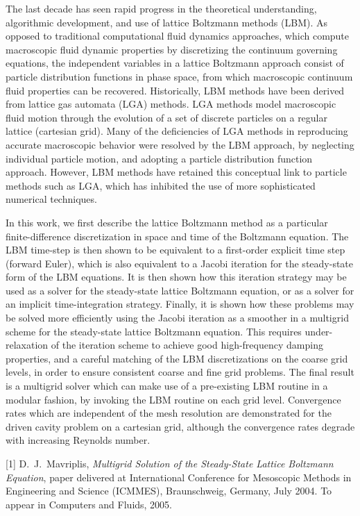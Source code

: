 \documentclass[twosided]{report}
\begin{document}
The last decade has seen rapid progress in the theoretical
understanding, algorithmic development, and use of lattice Boltzmann
methods (LBM). As opposed to traditional computational fluid dynamics
approaches, which compute macroscopic fluid dynamic properties by
discretizing the continuum governing equations, the independent
variables in a lattice Boltzmann approach consist of particle
distribution functions in phase space, from which macroscopic continuum
fluid properties can be recovered. Historically, LBM methods have been
derived from lattice gas automata (LGA) methods. LGA methods model
macroscopic fluid motion through the evolution of a set of discrete
particles on a regular lattice (cartesian grid). Many of the
deficiencies of LGA methods in reproducing accurate macroscopic
behavior were resolved by the LBM approach, by neglecting individual
particle motion, and adopting a particle distribution function
approach. However, LBM methods have retained this conceptual link to
particle methods such as LGA, which has inhibited the use of more
sophisticated numerical techniques.

In this work, we first describe the lattice Boltzmann method as a
particular finite-difference discretization in space and time of the
Boltzmann equation. The LBM time-step is then shown to be equivalent to
a first-order explicit time step (forward Euler), which is also
equivalent to a Jacobi iteration for the steady-state form of the LBM
equations. It is then shown how this iteration strategy may be used as
a solver for the steady-state lattice Boltzmann equation, or as a
solver for an implicit time-integration strategy. Finally, it is shown
how these problems may be solved more efficiently using the Jacobi
iteration as a smoother in a multigrid scheme for the steady-state
lattice Boltzmann equation. This requires under-relaxation of the
iteration scheme to achieve good high-frequency damping properties, and
a careful matching of the LBM discretizations on the coarse grid
levels, in order to ensure consistent coarse and fine grid problems.
The final result is a multigrid solver which can make use of a
pre-existing LBM routine in a modular fashion, by invoking the LBM
routine on each grid level. Convergence rates which are independent of
the mesh resolution are demonstrated for the driven cavity problem on a
cartesian grid, although the convergence rates degrade with increasing
Reynolds number.

[1] D.~J.~Mavriplis, {\em Multigrid Solution of the Steady-State Lattice
Boltzmann Equation}, paper delivered at International Conference for
Mesoscopic Methods in Engineering and Science (ICMMES), Braunschweig,
Germany, July 2004. To appear in Computers and Fluids, 2005.
\end{document}
